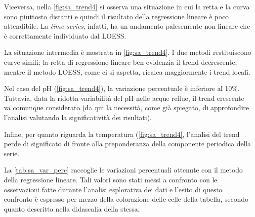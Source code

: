 Viceversa, nella \autoref{fig:sa_trend4} si osserva una situazione in cui la retta e la curva sono piuttosto distanti e quindi il risultato della regressione lineare è poco attendibile. La \textit{time series}, infatti, ha un andamento palesemente non lineare che è correttamente individuato dal LOESS.

La situazione intermedia è mostrata in \autoref{fig:sa_trend4}. I due metodi restituiscono curve simili: la retta di regressione lineare ben evidenzia il trend decrescente, mentre il metodo LOESS, come ci si aspetta, ricalca maggiormente i trend locali.

Nel caso del pH (\autoref{fig:sa_trend4}), la variazione percentuale è inferiore al 10\%. Tuttavia, data la ridotta variabilità del pH nelle acque reflue, il trend crescente va comunque considerato (da qui la necessità, come già spiegato, di approfondire l'analisi valutando la significatività dei risultati).

Infine, per quanto riguarda la temperatura (\autoref{fig:sa_trend4}, l'analisi del trend perde di significato di fronte alla preponderanza della componente periodica della serie.


La \autoref{tab:sa_var_perc} raccoglie le variazioni percentuali ottenute con il metodo della regressione lineare. Tali valori sono stati messi a confronto con le osservazioni fatte durante l'analisi esplorativa dei dati e l'esito di questo confronto è espresso per mezzo della colorazione delle celle della tabella, secondo quanto descritto nella didascalia della stessa.


